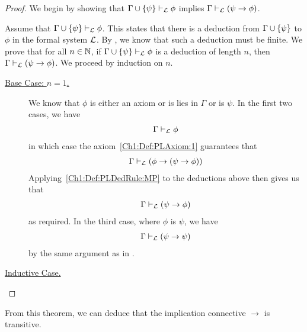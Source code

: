 \begin{proof}
    We begin by showing that $\Gamma \cup \left\{ \psi \right\} \vdash_{\mathcal{L}} \phi$ implies $\Gamma \vdash_{\mathcal{L}} \left( \psi \to \phi \right)$.

    Assume that $\Gamma \cup \left\{ \psi \right\} \vdash_{\mathcal{L}} \phi$. This states that there is a deduction from $\Gamma \cup \left\{ \psi \right\}$ to $\phi$ in the formal system $\mathcal{L}$. By , we know that such a deduction must be finite. We prove that for all $n \in \mathbb{N}$, if $\Gamma \cup \left\{ \psi \right\} \vdash_{\mathcal{L}} \phi$ is a deduction of length $n$, then $\Gamma \vdash_{\mathcal{L}} \left( \psi \to \phi \right)$. We proceed by induction on $n$.

    \begin{description}
        \item[\underline{Base Case: $n = 1$.}]
        We know that $\phi$ is either an axiom or is lies in $\Gamma$ or is $\psi$. In the first two cases, we have
        \begin{align*}
            \Gamma \vdash_{\mathcal{L}} \phi
        \end{align*}
        in which case the axiom~\ref{Ch1:Def:PLAxiom:1} guarantees that
        \begin{align*}
            \Gamma \vdash_{\mathcal{L}} \left( \phi \to \left( \psi \to \phi \right) \right)
        \end{align*}
        Applying~\ref{Ch1:Def:PLDedRule:MP} to the deductions above then gives us that
        \begin{align*}
            \Gamma \vdash_{\mathcal{L}} \left( \psi \to \phi \right)
        \end{align*}
        as required. In the third case, where $\phi$ is $\psi$, we have
        \begin{align*}
            \Gamma \vdash_{\mathcal{L}} \left( \psi \to \psi \right)
        \end{align*}
        by the same argument as in .
    
    \item[\underline{Inductive Case.}] \sorry
    \end{description}
\end{proof}

From this theorem, we can deduce that the implication connective $\to$ is transitive.

